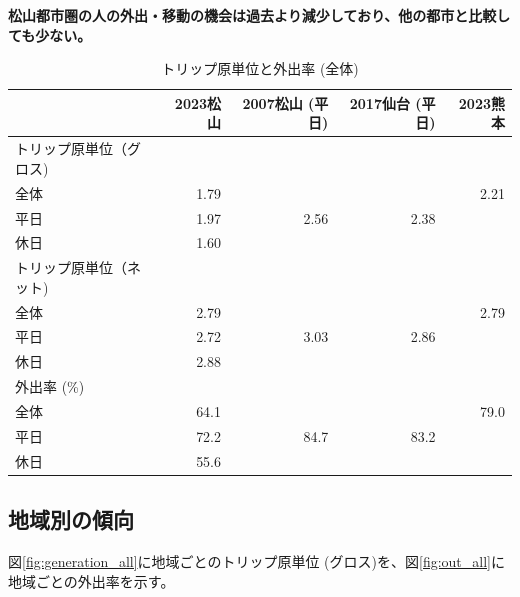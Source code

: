\documentclass[a4paper,12pt, uplatex]{jsbook}
\begin{document}
\color{red}
\begin{framed}
\noindent
\textbf{\large 松山都市圏の人の外出・移動の機会は過去より減少しており、他の都市と比較しても少ない。}
\end{framed}
\color{black}

\begin{table}[htbp]
\centering
\caption{トリップ原単位と外出率 (全体)\cite{松山市総合交通戦略}\cite{ibs_report}}
\label{tab:トリップ、外出率}
\begin{tabular}{lrrrr}
\toprule
 & 2023松山 & 2007松山 (平日) & 2017仙台 (平日) & 2023熊本\\
\midrule
トリップ原単位（グロス) &  &  & & \\
\hspace{2em} 全体 &  1.79 &  & & 2.21\\
\hspace{2em} 平日 & 1.97 & 2.56 & 2.38 &\\
\hspace{2em} 休日 & 1.60 &&&\\
トリップ原単位（ネット) & &  &  & \\
\hspace{2em} 全体 & 2.79 &  &  & 2.79\\
\hspace{2em} 平日 & 2.72 & 3.03 & 2.86 &\\
\hspace{2em} 休日 & 2.88 &&&\\
外出率 (\%) & &  &  & \\
\hspace{2em} 全体 & 64.1 &  &  & 79.0\\
\hspace{2em} 平日 & 72.2 & 84.7 & 83.2 &\\
\hspace{2em} 休日 & 55.6 &&&\\
\bottomrule
\end{tabular}
\end{table}


\clearpage
\subsection{地域別の傾向}
図\ref{fig:generation_all}に地域ごとのトリップ原単位 (グロス)を、図\ref{fig:out_all}に地域ごとの外出率を示す。
\end{document}
